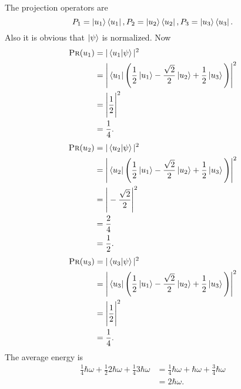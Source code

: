 \documentclass[10pt]{article}
\begin{document}
The projection operators are
\[
P_1 = \ket{u_1} \bra{u_1}, \\
P_2 = \ket{u_2} \bra{u_2}, \\
P_3 = \ket{u_3} \bra{u_3}.
\]
Also it is obvious that $\ket{\psi}$ is normalized. Now
\begin{align*}
\textsc{Pr}(u_1) &= | \braket{u_1 | \psi} |^2 \\
                         &=\Bigg| \bra{u_1} \Bigg( \frac{1}{2} \ket{u_1} - \frac{\sqrt{2}}{2} \ket{u_2} + \frac{1}{2} \ket{u_3} \Bigg) \Bigg|^2 \\
                         &= \Bigg| \frac{1}{2}\Bigg|^2 \\
                         &= \frac{1}{4}.
\end{align*}
\begin{align*}
\textsc{Pr}(u_2) &= | \braket{u_2 | \psi} |^2 \\
                         &=\Bigg| \bra{u_2} \Bigg( \frac{1}{2} \ket{u_1} - \frac{\sqrt{2}}{2} \ket{u_2} + \frac{1}{2} \ket{u_3} \Bigg) \Bigg|^2 \\
                         &= \Bigg| -\frac{\sqrt{2}}{2}\Bigg|^2 \\
                         &= \frac{2}{4} \\
                         &= \frac{1}{2}.
\end{align*}
\begin{align*}
\textsc{Pr}(u_3) &= | \braket{u_3 | \psi} |^2 \\
                         &=\Bigg| \bra{u_3} \Bigg( \frac{1}{2} \ket{u_1} - \frac{\sqrt{2}}{2} \ket{u_2} + \frac{1}{2} \ket{u_3} \Bigg) \Bigg|^2 \\
                         &= \Bigg| \frac{1}{2}\Bigg|^2 \\
                         &= \frac{1}{4}.
\end{align*}
The average energy is
\begin{align*}
\frac{1}{4} \hbar \omega + \frac{1}{2} 2 \hbar \omega+ \frac{1}{4}3\hbar \omega &= \frac{1}{4} \hbar \omega + \hbar \omega + \frac{3}{4} \hbar \omega \\
     &= 2\hbar \omega. 
\end{align*}
\end{document}
